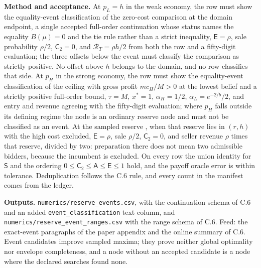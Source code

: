\textbf{Method and acceptance.} At \(p_L=h\) in the weak economy, the row
must show the equality-event classification of the zero-cost comparison at
the domain endpoint, a single
accepted full-order continuation whose status names the equality \(B(\mu)=0\) and the
tie rule rather than a strict inequality, \(\mathsf E=\rho\), sale
probability \(\rho/2\), \(\mathsf C_2=0\), and
\(\mathcal R_T=\rho h/2\) from both the row and a fifty-digit
evaluation; the three offsets below the event must classify the comparison as
strictly positive. No offset above \(h\) belongs to the domain, and no row
classifies that side. At \(p_H\)
in the strong economy, the row must show the equality-event
classification of the ceiling with gross profit \(mc_H/M>0\) at the lowest
belief and a
strictly positive full-order bound, \(\tau=M\), \(x^*=1\),
\(\alpha_H=1/2\), \(\alpha_L=e^{-2/b}/2\), and entry and revenue
agreeing with the fifty-digit evaluation; where \(p_H\) falls outside
its defining regime the node is an ordinary reserve node and must not be
classified as an event. At the sampled reserve
, when that reserve lies in \((r,h)\) with
the high cost excluded,
\(\mathsf E=\rho\), sale \(\rho/2\), \(\mathsf C_2=0\), and
seller revenue \(\rho\) times that reserve, divided by two: preparation there does not mean two
admissible bidders, because the incumbent is excluded. On every row the
union identity for \(\mathsf S\) and the ordering
\(0\le\mathsf C_2\le\mathsf A\le\mathsf E\le1\) hold, and the payoff
oracle error is within tolerance. Deduplication follows the C.6 rule,
and every count in the manifest comes from the ledger.

\textbf{Outputs.} \texttt{numerics/reserve\_events.csv}, with the
continuation schema of C.6 and an added \texttt{event\_classification}
text column, and \texttt{numerics/reserve\_event\_ranges.csv} with the
range schema of C.6. Feed: the exact-event paragraphs of the paper
appendix and the online summary of C.6. Event candidates improve sampled
maxima; they prove neither global optimality nor envelope completeness,
and a node without an accepted candidate is a node where the declared
searches found none.
